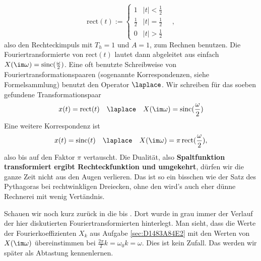\begin{Loesung}
\begin{equation}
\text{rect}(t) := \begin{cases} 1 & |t| < \frac{1}{2} \\ \frac{1}{2} & |t| = \frac{1}{2} \\ 0 & |t| > \frac{1}{2} \end{cases}\quad,
\end{equation}
also den Rechteckimpuls mit $T_h=1$ und $A=1$, zum Rechnen benutzen.
%
Die Fouriertransformierte von $\text{rect}(t)$ lautet dann abgeleitet aus
 einfach
$X(\im \omega) = \mathrm{sinc}(\frac{\omega}{2})$.
%
Eine oft benutzte Schreibweise von Fouriertransformationspaaren (sogenannte
Korrespondenzen, siehe Formelsammlung) benutzt den Operator $\laplace$.
%
Wir schreiben für das soeben gefundene Transformationspaar
\begin{equation}
x(t) = \text{rect}(t) \quad \laplace \quad X(\im \omega) = \mathrm{sinc}(\frac{\omega}{2})
\end{equation}
%
Eine weitere Korrespondenz ist
\begin{equation}
x(t) = \text{sinc}(t) \quad \laplace \quad X(\im \omega) = \pi \, \mathrm{rect}(\frac{\omega}{2}),
\end{equation}
also bis auf den Faktor $\pi$ vertauscht.
%
Die Dualität, also \textbf{Spaltfunktion transformiert ergibt Rechteckfunktion und umgekehrt},
dürfen wir die ganze Zeit nicht aus den Augen verlieren. Das ist so ein bisschen
wie der Satz des Pythagoras bei rechtwinkligen Dreiecken, ohne den wird's auch eher
dünne Rechnerei mit wenig Vertändnis.

Schauen wir noch kurz zurück in die  bis .
Dort wurde in grau immer der Verlauf der hier diskutierten Fouriertransformierten
hinterlegt. Man sieht, dass die Werte der Fourierkoeffizienten $X_k$
 aus Aufgabe \ref{sec:D1483A84E2}
mit den Werten von $X(\im\omega)$  übereinstimmen bei
$\frac{2\pi}{T} k = \omega_0 k = \omega$.
Dies ist kein Zufall. Das werden wir später als Abtastung kennenlernen.



\end{Loesung}

